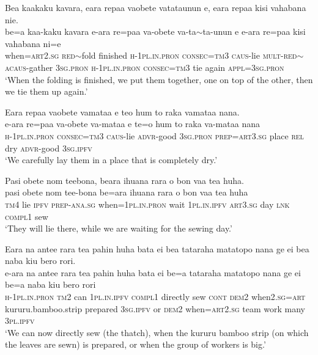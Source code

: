 \ea\label{ex:text12-17}
Bea kaakaku kavara, eara repaa vaobete vatataunun e, eara repaa kisi vahabana nie.\\
\gll be=a	kaa-kaku	kavara	e-ara	re=paa	va-obete	va-ta{$\sim$}ta-unun	e	e-ara	re=paa	kisi	vahabana	ni=e\\
     when=\textsc{art}2.\textsc{sg}	\textsc{red}{$\sim$}fold	finished	\textsc{h}-1\textsc{pl}.\textsc{in}.\textsc{pron}	\textsc{consec}=\textsc{tm}3	\textsc{caus}-lie	\textsc{mult}-\textsc{red}{$\sim$}\textsc{acaus}-gather	3\textsc{sg}.\textsc{pron}	\textsc{h}-1\textsc{pl}.\textsc{in}.\textsc{pron}	\textsc{consec}=\textsc{tm}3	tie	again	\textsc{appl}=3\textsc{sg}.\textsc{pron}\\
\glt `When the folding is finished, we put them together, one on top of the other, then we tie them up again.'
\z

\newpage
\ea\label{ex:text12-18}
Eara repaa vaobete vamataa e teo hum to raka vamataa nana.\\
\gll e-ara	re=paa	va-obete	va-mataa	e	te=o	hum	to	raka	va-mataa	nana\\
     \textsc{h}-1\textsc{pl}.\textsc{in}.\textsc{pron}	\textsc{consec}=\textsc{tm}3	\textsc{caus}-lie	\textsc{advr}-good	3\textsc{sg}.\textsc{pron}	\textsc{prep}=\textsc{art}3.\textsc{sg}	place	\textsc{rel}	dry	\textsc{advr}-good	3\textsc{sg}.\textsc{ipfv}\\
\glt `We carefully lay them in a place that is completely dry.'
\z

\ea\label{ex:text12-19}
Pasi obete nom teebona, beara ihuana rara o bon vaa tea huha.\\
\gll pasi	obete	nom	tee-bona	be=ara	ihuana	rara	o	bon	vaa	tea	huha\\
     \textsc{tm}4	lie	\textsc{ipfv}	\textsc{prep}-\textsc{ana}.\textsc{sg}	when=1\textsc{pl}.\textsc{in}.\textsc{pron}	wait	1\textsc{pl}.\textsc{in}.\textsc{ipfv}	\textsc{art}3.\textsc{sg}	day	\textsc{lnk}	\textsc{compl}1	sew\\
\glt `They will lie there, while we are waiting for the sewing day.'
\z

\ea\label{ex:text12-20}
Eara na antee rara tea pahin huha bata ei bea tataraha matatopo nana ge ei bea naba kiu bero rori.\\
\gll e-ara	na	antee	rara	tea	pahin	huha	bata	ei	be=a	tataraha	matatopo	nana	ge	ei	be=a	naba	kiu	bero	rori\\
     \textsc{h}-1\textsc{pl}.\textsc{in}.\textsc{pron}	\textsc{tm}2	can	1\textsc{pl}.\textsc{in}.\textsc{ipfv}	\textsc{compl}1	directly	sew	\textsc{cont}	\textsc{dem}2	when2.\textsc{sg}=\textsc{art}	kururu.bamboo.strip	prepared	3\textsc{sg}.\textsc{ipfv}	or	\textsc{dem}2	when=\textsc{art}2.\textsc{sg}	team	work	many	3\textsc{pl}.\textsc{ipfv}\\
\glt `We can now directly sew (the thatch), when the kururu bamboo strip (on which the leaves are sewn) is prepared, or when the group of workers is big.'
\z

